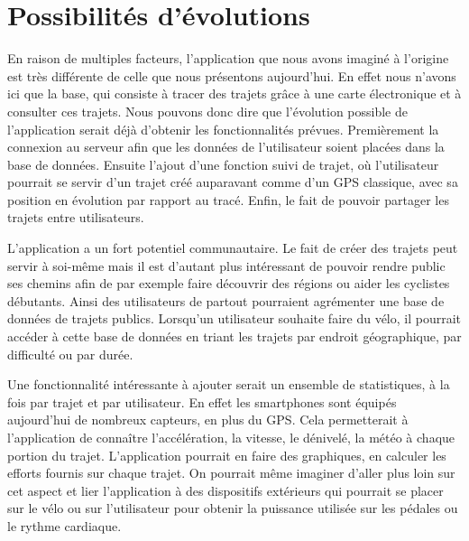 \newpage
\section{Possibilités d'évolutions}
En raison de multiples facteurs, l'application que nous avons imaginé à l'origine est très différente de celle que nous présentons aujourd'hui.
En effet nous n'avons ici que la base, qui consiste à tracer des trajets grâce à une carte électronique et à consulter ces trajets. Nous pouvons
donc dire que l'évolution possible de l'application serait déjà d'obtenir les fonctionnalités prévues. Premièrement la connexion au serveur
afin que les données de l'utilisateur soient placées dans la base de données. Ensuite l'ajout d'une fonction suivi de trajet, où l'utilisateur
pourrait se servir d'un trajet créé auparavant comme d'un GPS classique, avec sa position en évolution par rapport au tracé. Enfin, le fait
de pouvoir partager les trajets entre utilisateurs.

L'application a un fort potentiel communautaire. Le fait de créer des trajets peut servir à soi-même mais il est d'autant plus intéressant
de pouvoir rendre public ses chemins afin de par exemple faire découvrir des régions ou aider les cyclistes débutants. Ainsi des utilisateurs
de partout pourraient agrémenter une base de données de trajets publics. Lorsqu'un utilisateur souhaite faire du vélo, il pourrait accéder
à cette base de données en triant les trajets par endroit géographique, par difficulté ou par durée.

Une fonctionnalité intéressante à ajouter serait un ensemble de statistiques, à la fois par trajet et par utilisateur. En effet les smartphones
sont équipés aujourd'hui de nombreux capteurs, en plus du GPS. Cela permetterait à l'application de connaître l'accélération, la vitesse, le
dénivelé, la météo à chaque portion du trajet. L'application pourrait en faire des graphiques, en calculer les efforts fournis sur chaque trajet.
On pourrait même imaginer d'aller plus loin sur cet aspect et lier l'application à des dispositifs extérieurs qui pourrait se placer sur le
vélo ou sur l'utilisateur pour obtenir la puissance utilisée sur les pédales ou le rythme cardiaque.